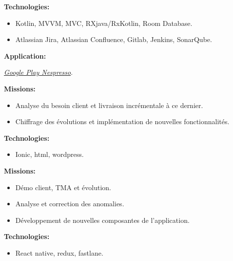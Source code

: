 \documentclass[10pt,a4paper,withhyper]{altacv}
\begin{document}
\begin{paracol}{2}
\textbf{Technologies:}
\begin{itemize}
	\addtolength{\itemindent}{0.1cm}
	\item Kotlin, MVVM, MVC, RXjava/RxKotlin, Room Database.
	\item Atlassian Jira, Atlassian Confluence, Gitlab, Jenkins, SonarQube.
\end{itemize}
\textbf{Application:}

\href{https://play.google.com/store/apps/details?id=com.nespresso.activities&hl=fr}{\textit{Google Play Nespresso}}.

\divider



\textbf{Missions:}
\begin{itemize}
	\addtolength{\itemindent}{0.1cm}
	\item Analyse du besoin client et livraison incrémentale à ce dernier.
	\item Chiffrage des évolutions et implémentation de nouvelles fonctionnalités.
\end{itemize}

\textbf{Technologies:}
\begin{itemize}
	\addtolength{\itemindent}{0.1cm}
	\item Ionic, html, wordpress.
\end{itemize}

\divider


\textbf{Missions:}

\begin{itemize}
\addtolength{\itemindent}{0.1cm}
\item Démo client, TMA et évolution.
\item Analyse et correction des anomalies.
\item Développement de nouvelles composantes de l'application.

\end{itemize}

\textbf{Technologies:}

\begin{itemize}
	\addtolength{\itemindent}{0.1cm}
	\item React native, redux, fastlane.
	
\end{itemize}
\divider


\end{paracol}
\end{document}
